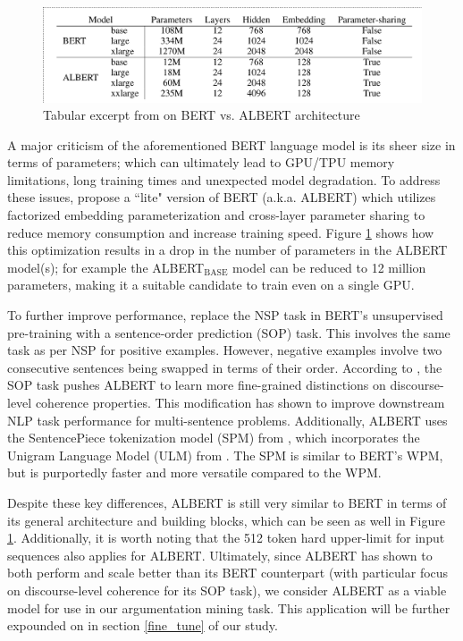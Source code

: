 \begin{figure}[t]
    \centering
    \includegraphics[trim={0.2cm 0cm 0cm 0.2cm},clip,width=\textwidth]{img/albert_comparison.png}
    \caption{Tabular excerpt from \citet{lan2019albert} on BERT vs. ALBERT architecture}
    \label{albert_comparison}
\end{figure}

A major criticism of the aforementioned BERT language model is its sheer size in terms of parameters; which can ultimately lead to GPU/TPU memory limitations, long training times and unexpected model degradation. To address these issues, \citet{lan2019albert} propose a ``lite" version of BERT (a.k.a. ALBERT) which utilizes factorized embedding parameterization and cross-layer parameter sharing to reduce memory consumption and increase training speed. Figure \ref{albert_comparison} shows how this optimization results in a drop in the number of parameters in the ALBERT model(s); for example the ALBERT$_{\text{BASE}}$ model can be reduced to 12 million parameters, making it a suitable candidate to train even on a single GPU.

To further improve performance, \citet{lan2019albert} replace the NSP task in BERT's unsupervised pre-training with a sentence-order prediction (SOP) task. This involves the same task as per NSP for positive examples. However, negative examples involve two consecutive sentences being swapped in terms of their order. According to \citet{lan2019albert}, the SOP task pushes ALBERT to learn more fine-grained distinctions on discourse-level coherence properties. This modification has shown to improve downstream NLP task performance for multi-sentence problems. Additionally, ALBERT uses the SentencePiece tokenization model (SPM) from \citet{kudo2018sentencepiece}, which incorporates the Unigram Language Model (ULM) from \citet{kudo2018subword}. The SPM is similar to BERT's WPM, but is purportedly faster and more versatile compared to the WPM.

Despite these key differences, ALBERT is still very similar to BERT in terms of its general architecture and building blocks, which can be seen as well in Figure \ref{albert_comparison}. Additionally, it is worth noting that the 512 token hard upper-limit for input sequences also applies for ALBERT. Ultimately, since ALBERT has shown to both perform and scale better than its BERT counterpart (with particular focus on discourse-level coherence for its SOP task), we consider ALBERT as a viable model for use in our argumentation mining task. This application will be further expounded on in section \ref{fine_tune} of our study.